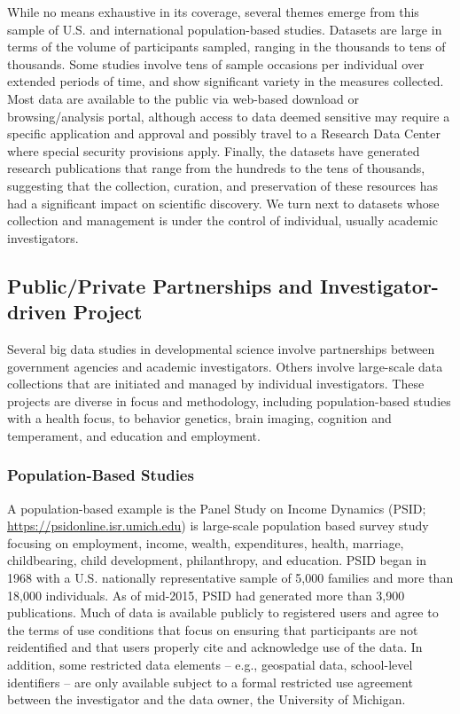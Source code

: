 \documentclass[letterpaper,man,apacite]{apa6}
\begin{document}
While no means exhaustive in its coverage, several themes emerge from this sample of U.S. and international population-based studies.
Datasets are large in terms of the volume of participants sampled, ranging in the thousands to tens of thousands.
Some studies involve tens of sample occasions per individual over extended periods of time, and show significant variety in the measures collected.
Most data are available to the public via web-based download or browsing/analysis portal, although access to data deemed sensitive may require a specific application and approval and possibly travel to a Research Data Center where special security provisions apply.
Finally, the datasets have generated research publications that range from the hundreds to the tens of thousands, suggesting that the collection, curation, and preservation of these resources has had a significant impact on scientific discovery.
We turn next to datasets whose collection and management is under the control of individual, usually academic investigators.

\subsection{Public/Private Partnerships and Investigator-driven Project}

Several big data studies in developmental science involve partnerships between government agencies and academic investigators.
Others involve large-scale data collections that are initiated and managed by individual investigators.
These projects are diverse in focus and methodology, including population-based studies with a health focus, to behavior genetics, brain imaging, cognition and temperament, and education and employment.

\subsubsection{Population-Based Studies}

A population-based example is the Panel Study on Income Dynamics (PSID; \url{https://psidonline.isr.umich.edu}) is large-scale population based survey study focusing on employment, income, wealth, expenditures, health, marriage, childbearing, child development, philanthropy, and education.
PSID began in 1968 with a U.S. nationally representative sample of 5,000 families and more than 18,000 individuals.
As of mid-2015, PSID had generated more than 3,900 publications. 
Much of data is available publicly to registered users and agree to the terms of use conditions that focus on ensuring that participants are not reidentified and that users properly cite and acknowledge use of the data. 
In addition, some restricted data elements -- e.g., geospatial data, school-level identifiers -- are only available subject to a formal restricted use agreement between the investigator and the data owner, the University of Michigan.
\end{document}
